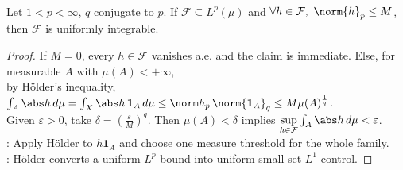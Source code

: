 \begin{corollary} \label{cor:lp-bounded-families-uniformly-integrable} \\
Let $1<p<\infty$, $q$ conjugate to $p$. If $\mathcal{F}\subseteq L^p(\mu)$ and $\forall h\in\mathcal{F},\ \norm{h}_p\leq M$, then $\mathcal{F}$ is uniformly integrable.
\begin{proof}
If $M=0$, every $h\in\mathcal{F}$ vanishes a.e. and the claim is immediate. Else, for measurable $A$ with $\mu(A)<+\infty$,\\
by H\"older's inequality, $\int_A\abs h\,d\mu=\int_X\abs h\,\mathbf 1_A\,d\mu\leq\norm h_p\,\norm{\mathbf 1_A}_q\leq M\mu(A)^{\frac{1}{q}}$.\\
Given $\varepsilon>0$, take $\delta=(\frac{\varepsilon}{M})^q$. Then $\mu(A)<\delta$ implies $\sup\limits_{h\in\mathcal F}\int_A\abs h\,d\mu<\varepsilon$.\\
: Apply H\"older to $h\mathbf 1_A$ and choose one measure threshold for the whole family.\\
: H\"older converts a uniform $L^p$ bound into uniform small-set $L^1$ control.
\end{proof}
\end{corollary}

